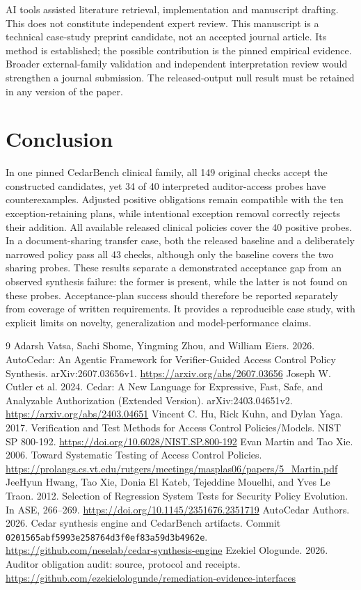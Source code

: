 \documentclass[sigconf,nonacm]{acmart}
\begin{document}
AI tools assisted literature retrieval, implementation and manuscript drafting. This does not constitute independent expert review. This manuscript is a technical case-study preprint candidate, not an accepted journal article. Its method is established; the possible contribution is the pinned empirical evidence. Broader external-family validation and independent interpretation review would strengthen a journal submission. The released-output null result must be retained in any version of the paper.

\section{Conclusion}
In one pinned CedarBench clinical family, all 149 original checks accept the constructed candidates, yet 34 of 40 interpreted auditor-access probes have counterexamples. Adjusted positive obligations remain compatible with the ten exception-retaining plans, while intentional exception removal correctly rejects their addition. All available released clinical policies cover the 40 positive probes. In a document-sharing transfer case, both the released baseline and a deliberately narrowed policy pass all 43 checks, although only the baseline covers the two sharing probes. These results separate a demonstrated acceptance gap from an observed synthesis failure: the former is present, while the latter is not found on these probes. Acceptance-plan success should therefore be reported separately from coverage of written requirements. It provides a reproducible case study, with explicit limits on novelty, generalization and model-performance claims.

\begin{thebibliography}{9}
 Adarsh Vatsa, Sachi Shome, Yingming Zhou, and William Eiers. 2026. AutoCedar: An Agentic Framework for Verifier-Guided Access Control Policy Synthesis. arXiv:2607.03656v1. \url{https://arxiv.org/abs/2607.03656}
 Joseph W. Cutler et al. 2024. Cedar: A New Language for Expressive, Fast, Safe, and Analyzable Authorization (Extended Version). arXiv:2403.04651v2. \url{https://arxiv.org/abs/2403.04651}
 Vincent C. Hu, Rick Kuhn, and Dylan Yaga. 2017. Verification and Test Methods for Access Control Policies/Models. NIST SP 800-192. \url{https://doi.org/10.6028/NIST.SP.800-192}
 Evan Martin and Tao Xie. 2006. Toward Systematic Testing of Access Control Policies. \url{https://prolangs.cs.vt.edu/rutgers/meetings/masplas06/papers/5_Martin.pdf}
 JeeHyun Hwang, Tao Xie, Donia El Kateb, Tejeddine Mouelhi, and Yves Le Traon. 2012. Selection of Regression System Tests for Security Policy Evolution. In ASE, 266--269. \url{https://doi.org/10.1145/2351676.2351719}
 AutoCedar Authors. 2026. Cedar synthesis engine and CedarBench artifacts. Commit \texttt{0201565abf5993e258764d3f0ef83a59d3b4962e}. \url{https://github.com/neselab/cedar-synthesis-engine}
 Ezekiel Ologunde. 2026. Auditor obligation audit: source, protocol and receipts. \url{https://github.com/ezekielologunde/remediation-evidence-interfaces}
\end{thebibliography}
\end{document}

